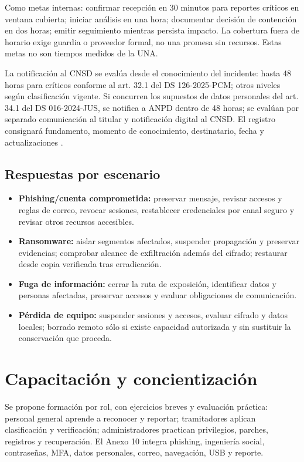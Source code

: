\documentclass[10pt,a4paper]{article}
\begin{document}
Como metas internas: confirmar recepción en 30 minutos para reportes críticos en ventana cubierta; iniciar análisis en una hora; documentar decisión de contención en dos horas; emitir seguimiento mientras persista impacto. La cobertura fuera de horario exige guardia o proveedor formal, no una promesa sin recursos. Estas metas no son tiempos medidos de la UNA.

La notificación al CNSD se evalúa desde el conocimiento del incidente: hasta 48 horas para críticos conforme al art. 32.1 del DS 126-2025-PCM; otros niveles según clasificación vigente. Si concurren los supuestos de datos personales del art. 34.1 del DS 016-2024-JUS, se notifica a ANPD dentro de 48 horas; se evalúan por separado comunicación al titular y notificación digital al CNSD. El registro consignará fundamento, momento de conocimiento, destinatario, fecha y actualizaciones \cite{R15,R17}.

\subsection{Respuestas por escenario}
\begin{itemize}
\item \textbf{Phishing/cuenta comprometida:} preservar mensaje, revisar accesos y reglas de correo, revocar sesiones, restablecer credenciales por canal seguro y revisar otros recursos accesibles.
\item \textbf{Ransomware:} aislar segmentos afectados, suspender propagación y preservar evidencias; comprobar alcance de exfiltración además del cifrado; restaurar desde copia verificada tras erradicación.
\item \textbf{Fuga de información:} cerrar la ruta de exposición, identificar datos y personas afectadas, preservar accesos y evaluar obligaciones de comunicación.
\item \textbf{Pérdida de equipo:} suspender sesiones y accesos, evaluar cifrado y datos locales; borrado remoto sólo si existe capacidad autorizada y sin sustituir la conservación que proceda.
\end{itemize}

\section{Capacitación y concientización}
Se propone formación por rol, con ejercicios breves y evaluación práctica: personal general aprende a reconocer y reportar; tramitadores aplican clasificación y verificación; administradores practican privilegios, parches, registros y recuperación. El Anexo 10 integra phishing, ingeniería social, contraseñas, MFA, datos personales, correo, navegación, USB y reporte.
\end{document}

